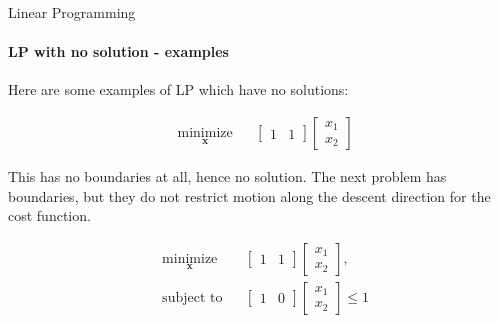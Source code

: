 \documentclass{beamer}
\begin{document}
\begin{frame}{Linear Programming}
\framesubtitle{LP with no solution - examples}
\begin{flushleft}

Here are some examples of LP which have no solutions:

\begin{equation}
\begin{aligned}
& \underset{\mathbf{x}}{\text{minimize}}
& & \begin{bmatrix} 1 & 1 \end{bmatrix} 
\begin{bmatrix} x_1 \\ x_2 \end{bmatrix}
\end{aligned}
\end{equation}

This has no boundaries at all, hence no solution. The next problem has boundaries, but they do not restrict motion along the descent direction for the cost function.

\begin{equation}
\begin{aligned}
& \underset{\mathbf{x}}{\text{minimize}}
& & \begin{bmatrix} 1 & 1 \end{bmatrix} 
\begin{bmatrix} x_1 \\ x_2 \end{bmatrix} , \\
& \text{subject to}
& & \begin{bmatrix} 1 & 0 \end{bmatrix}
\begin{bmatrix} x_1 \\ x_2 \end{bmatrix} \leq
1
%
\end{aligned}
\end{equation}

 
\end{flushleft}
\end{frame}
\end{document}
